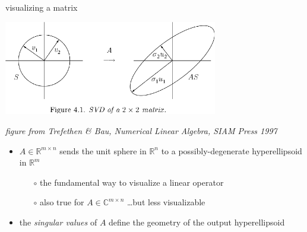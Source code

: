 \documentclass[10pt,hyperref]{beamer}
\newcommand{\CC}{\mathbb{C}}
\newcommand{\RR}{\mathbb{R}}
\begin{document}
\begin{frame}{visualizing a matrix}

\begin{center}
\includegraphics[width=0.7\textwidth]{figs/svd2d}
\end{center}

\vspace{-5mm}
\hfill \tiny \emph{figure from Trefethen \& Bau, \emph{Numerical Linear Algebra}, SIAM Press 1997} \normalsize

\bigskip
\begin{itemize}
\item $A \in \RR^{m\times n}$ sends the unit sphere in $\RR^n$ to a possibly-degenerate hyperellipsoid in $\RR^m$
    \begin{itemize}
    \item[$\circ$] \alert{the fundamental way to visualize a linear operator}
    \item[$\circ$] also true for $A \in \CC^{m\times n}$ \dots but less visualizable
    \end{itemize}
\item the \emph{singular values} of $A$ define the geometry of the output hyperellipsoid
\end{itemize}
\end{frame}
\end{document}
